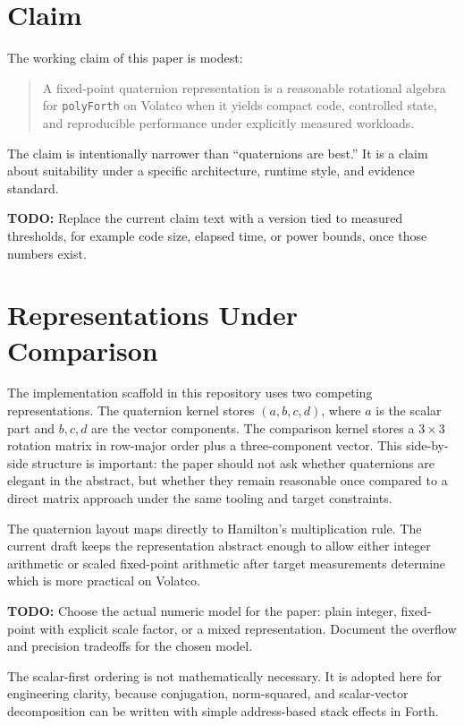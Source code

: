 \documentclass[11pt]{article}
\newcommand{\todoitem}[1]{%
  \par\noindent\textbf{TODO:} #1\par
}
\begin{document}
\section{Claim}

The working claim of this paper is modest:

\begin{quote}
A fixed-point quaternion representation is a reasonable rotational algebra for
\texttt{polyForth} on Volatco when it yields compact code, controlled state,
and reproducible performance under explicitly measured workloads.
\end{quote}

The claim is intentionally narrower than ``quaternions are best.'' It is a
claim about suitability under a specific architecture, runtime style, and
evidence standard.

\todoitem{Replace the current claim text with a version tied to measured
thresholds, for example code size, elapsed time, or power bounds, once those
numbers exist.}

\section{Representations Under Comparison}

The implementation scaffold in this repository uses two competing
representations. The quaternion kernel stores $(a,b,c,d)$, where $a$ is the
scalar part and $b,c,d$ are the vector components. The comparison kernel stores
a $3\times 3$ rotation matrix in row-major order plus a three-component vector.
This side-by-side structure is important: the paper should not ask whether
quaternions are elegant in the abstract, but whether they remain reasonable
once compared to a direct matrix approach under the same tooling and target
constraints.

The quaternion layout maps directly to Hamilton's multiplication rule. The
current draft keeps the representation abstract enough to allow either integer
arithmetic or scaled fixed-point arithmetic after target measurements determine
which is more practical on Volatco.

\todoitem{Choose the actual numeric model for the paper: plain integer,
fixed-point with explicit scale factor, or a mixed representation. Document the
overflow and precision tradeoffs for the chosen model.}

The scalar-first ordering is not mathematically necessary. It is adopted here
for engineering clarity, because conjugation, norm-squared, and scalar-vector
decomposition can be written with simple address-based stack effects in Forth.
\end{document}
